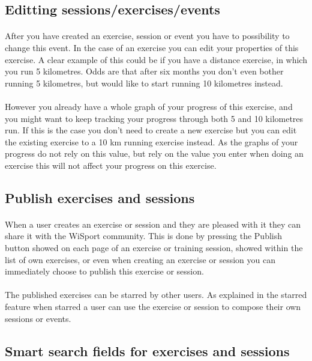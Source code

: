 \documentclass[11pt,a4paper]{scrartcl}
\begin{document}
\subsection{Editting sessions/exercises/events}
\paragraph{}After you have created an exercise, session or event you have to possibility to change this event. In the case of an exercise you can edit your properties of this exercise. A clear example of this could be if you have a distance exercise, in which you run 5 kilometres. Odds are that after six months you don't even bother running 5 kilometres, but would like to start running 10 kilometres instead.
\paragraph{}However you already have a whole graph of your progress of this exercise, and you might want to keep tracking your progress through both 5 and 10 kilometres run. If this is the case you don't need to create a new exercise but you can edit the existing exercise to a 10 km running exercise instead. As the graphs of your progress do not rely on this value, but rely on the value you enter when doing an exercise this will not affect your progress on this exercise.
\subsection{Publish exercises and sessions}
\paragraph{}When a user creates an exercise or session and they are pleased with it they can share it with the WiSport community. This is done by pressing the Publish button showed on each page of an exercise or training session, showed within the list of own exercises, or even when creating an exercise or session you can immediately choose to publish this exercise or session.
\paragraph{}The published exercises can be starred by other users. As explained in the starred feature when starred a user can use the exercise or session to compose their  own sessions or events.
\subsection{Smart search fields for exercises and sessions}
\end{document}
